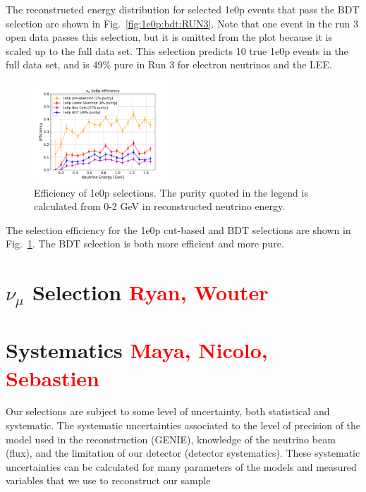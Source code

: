 \documentclass[a4paper]{article}
\begin{document}
The reconstructed energy distribution for selected 1e0p events that pass the BDT selection are shown in Fig.~\ref{fig:1e0p:bdt:RUN3}.  Note that one event in the run 3 open data passes this selection, but it is omitted from the plot because it is scaled up to the full data set.  This selection predicts 10 true 1e0p events in the full data set, and is 49\% pure in Run 3 for electron neutrinos and the LEE.

\begin{figure}[H]
\begin{center}
\includegraphics[width=0.45\textwidth]{1e0p/efficiency_RUN3.pdf}
\caption{\label{fig:1e0p:eff:RUN3} Efficiency of 1e0p selections.  The purity quoted in the legend is calculated from 0-2 GeV in reconstructed neutrino energy.}
\end{center}
\end{figure}

The selection efficiency for the 1e0p cut-based and BDT selections are shown in Fig.~\ref{fig:1e0p:eff:RUN3}.  The BDT selection is both more efficient and more pure. 

\clearpage
\section{$\nu_{\mu}$ Selection \textcolor{red}{Ryan, Wouter}}
\label{sec:numuselection}

\clearpage

\section{Systematics \textcolor{red}{Maya, Nicolo, Sebastien}}
\label{sec:systematics}

Our selections are subject to some level of uncertainty, both statistical and systematic. The systematic uncertainties associated to the level of precision of the model used in the reconstruction (GENIE), knowledge of the neutrino beam (flux), and the limitation of our detector (detector systematics). These systematic uncertainties can be calculated for many parameters of the models and measured variables that we use to reconstruct our sample
\end{document}
